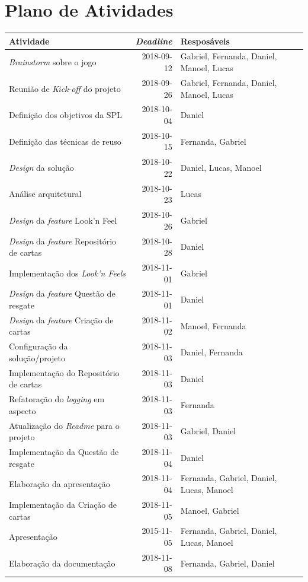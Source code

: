 \documentclass[11pt]{article}
\begin{document}
\section{Plano de Atividades}
\label{sec:org1bff7c0}
\begin{center}
\begin{tabular}{lrl}
Atividade & \emph{Deadline} & Resposáveis\\
\hline
\emph{Brainstorm} sobre o jogo & 2018-09-12 & Gabriel, Fernanda, Daniel, Manoel, Lucas\\
Reunião de \emph{Kick}-\emph{off} do projeto & 2018-09-26 & Gabriel, Fernanda, Daniel, Manoel, Lucas\\
Definição dos objetivos da SPL & 2018-10-04 & Daniel\\
Definição das técnicas de reuso & 2018-10-15 & Fernanda, Gabriel\\
\emph{Design} da solução & 2018-10-22 & Daniel, Lucas, Manoel\\
Análise arquitetural & 2018-10-23 & Lucas\\
\emph{Design} da \emph{feature} Look'n Feel & 2018-10-26 & Gabriel\\
\emph{Design} da \emph{feature} Repositório de cartas & 2018-10-28 & Daniel\\
Implementação dos \emph{Look'n Feels} & 2018-11-01 & Gabriel\\
\emph{Design} da \emph{feature} Questão de resgate & 2018-11-01 & Daniel\\
\emph{Design} da \emph{feature} Criação de cartas & 2018-11-02 & Manoel, Fernanda\\
Configuração da solução/projeto & 2018-11-03 & Daniel, Fernanda\\
Implementação do Repositório de cartas & 2018-11-03 & Daniel\\
Refatoração do \emph{logging} em aspecto & 2018-11-03 & Fernanda\\
Atualização do \emph{Readme} para o projeto & 2018-11-03 & Gabriel, Daniel\\
Implementação da Questão de resgate & 2018-11-04 & Daniel\\
Elaboração da apresentação & 2018-11-04 & Fernanda, Gabriel, Daniel, Lucas, Manoel\\
Implementação da Criação de cartas & 2018-11-05 & Manoel, Gabriel\\
Apresentação & 2015-11-05 & Fernanda, Gabriel, Daniel, Lucas, Manoel\\
Elaboração da documentação & 2018-11-08 & Fernanda, Gabriel, Daniel\\
\end{tabular}
\end{center}
\end{document}
